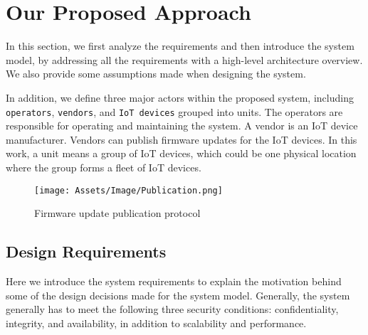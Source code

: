 \documentclass[conference]{IEEEtran}
\begin{document}
\section{Our Proposed Approach} \label{sec:3}

In this section, we first analyze the requirements and then introduce the system model, by addressing all the requirements with a high-level architecture overview. We also provide some assumptions made when designing the system.

In addition, we define three major actors within the proposed  system, including \texttt{operators}, \texttt{vendors}, and \texttt{IoT devices} grouped into units. The operators are responsible for operating and maintaining the system. A vendor is an IoT device manufacturer. Vendors can publish firmware updates for the IoT devices. In this work, a unit means a group of IoT devices, which could be one physical location where the group forms a fleet of IoT devices.

\begin{figure*}[t]
\centering
\texttt{[image: Assets/Image/Publication.png]}
\caption{Firmware update publication protocol}
\label{fig:Publication}
\vspace{-2mm}
\end{figure*}


\subsection{Design Requirements}

Here we introduce the system requirements to explain the motivation behind some of the design decisions made for the system model. Generally, the system generally has to meet the following three security conditions: confidentiality, integrity, and availability, in addition to scalability and performance.
\end{document}
